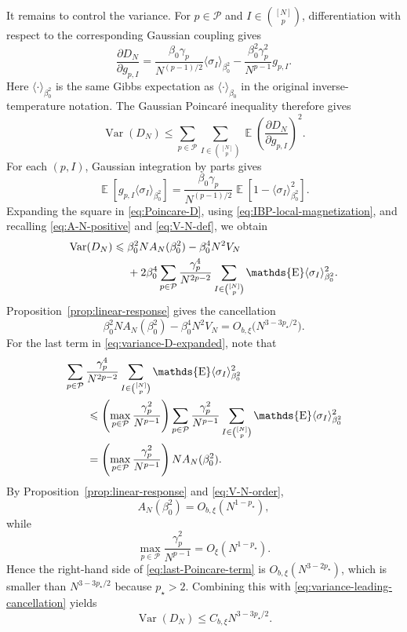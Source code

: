 \documentclass[letterpaper,11pt,reqno]{amsart}
\renewcommand{\leq}{\leqslant}
\newcommand{\cP}{\mathcal{P}}\newcommand{\cQ}{\mathcal{Q}}\newcommand{\cR}{\mathcal{R}}
\DeclareMathOperator{\E}{\mathds{E}}
\DeclareMathOperator{\var}{Var}
\begin{document}
It remains to control the variance. For $p\in\cP$ and
$I\in\binom{[N]}p$, differentiation with respect to the corresponding
Gaussian coupling gives
\begin{equation}
\frac{\partial D_N}{\partial g_{p,I}}
=
\frac{\beta_0\gamma_p}{N^{(p-1)/2}}
\langle\sigma_I\rangle_{\beta_0^2}
-
\frac{\beta_0^2\gamma_p^2}{N^{p-1}}g_{p,I}.
\label{eq:D-gradient}
\end{equation}
Here $\langle\cdot\rangle_{\beta_0^2}$ is the same Gibbs expectation
as $\langle\cdot\rangle_{\beta_0}$ in the original inverse-temperature
notation. The Gaussian Poincar\'e inequality therefore gives
\begin{equation}
\var(D_N)
\leq
\sum_{p\in\cP}
\sum_{I\in\binom{[N]}p}
\E\left(
\frac{\partial D_N}{\partial g_{p,I}}
\right)^2.
\label{eq:Poincare-D}
\end{equation}
For each $(p,I)$, Gaussian integration by parts gives
\begin{equation}
\E\left[
g_{p,I}\langle\sigma_I\rangle_{\beta_0^2}
\right]
=
\frac{\beta_0\gamma_p}{N^{(p-1)/2}}
\E\left[
1-\langle\sigma_I\rangle_{\beta_0^2}^2
\right].
\label{eq:IBP-local-magnetization}
\end{equation}
Expanding the square in \eqref{eq:Poincare-D}, using
\eqref{eq:IBP-local-magnetization}, and recalling
\eqref{eq:A-N-positive} and \eqref{eq:V-N-def}, we obtain
\begin{align}
\var(D_N)
\leq{}&
\beta_0^2N A_N(\beta_0^2)
-
\beta_0^4N^2V_N
\notag\\
&+
2\beta_0^4
\sum_{p\in\cP}
\frac{\gamma_p^4}{N^{2p-2}}
\sum_{I\in\binom{[N]}p}
\E\langle\sigma_I\rangle_{\beta_0^2}^2.
\label{eq:variance-D-expanded}
\end{align}
Proposition~\ref{prop:linear-response} gives the cancellation
\begin{equation}
\beta_0^2N A_N(\beta_0^2)
-
\beta_0^4N^2V_N
=
O_{b,\xi}\bigl(N^{3-3p_\star/2}\bigr).
\label{eq:variance-leading-cancellation}
\end{equation}
For the last term in \eqref{eq:variance-D-expanded}, note that
\begin{align}
&
\sum_{p\in\cP}
\frac{\gamma_p^4}{N^{2p-2}}
\sum_{I\in\binom{[N]}p}
\E\langle\sigma_I\rangle_{\beta_0^2}^2
\notag\\
&\qquad\leq
\left(
\max_{p\in\cP}\frac{\gamma_p^2}{N^{p-1}}
\right)
\sum_{p\in\cP}
\frac{\gamma_p^2}{N^{p-1}}
\sum_{I\in\binom{[N]}p}
\E\langle\sigma_I\rangle_{\beta_0^2}^2
\notag\\
&\qquad=
\left(
\max_{p\in\cP}\frac{\gamma_p^2}{N^{p-1}}
\right)
N A_N(\beta_0^2).
\label{eq:last-Poincare-term}
\end{align}
By Proposition~\ref{prop:linear-response} and
\eqref{eq:V-N-order},
\[
A_N(\beta_0^2)=O_{b,\xi}(N^{1-p_\star}),
\]
while
\[
\max_{p\in\cP}\frac{\gamma_p^2}{N^{p-1}}
=O_\xi(N^{1-p_\star}).
\]
Hence the right-hand side of \eqref{eq:last-Poincare-term} is
$O_{b,\xi}(N^{3-2p_\star})$, which is smaller than
$N^{3-3p_\star/2}$ because $p_\star>2$. Combining this with
\eqref{eq:variance-leading-cancellation} yields
\begin{equation}
\var(D_N)
\leq
C_{b,\xi}N^{3-3p_\star/2}.
\label{eq:variance-D-final}
\end{equation}
\end{document}
